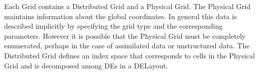 %



Each Grid contains a Distributed Grid and a Physical Grid. The Physical Grid
maintains information about the global coordinates. In general this data is
described implicitly by specifying the grid type and the corresponding
parameters. However it is possible that the Physical Grid must be completely
enumerated, perhaps in the case of assimilated data or unstructured data. The
Distributed Grid defines an index space that corresponds to cells in the Physical Grid and is decomposed among DEs in a DELayout.
